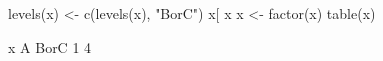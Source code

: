 \begin{Schunk}
\begin{Sinput}
  levels(x) <- c(levels(x), "BorC")
  x[ x %in% c("B", "C")] <- "BorC"
  x <- factor(x)
  table(x)
\end{Sinput}
\begin{Soutput}
x
   A BorC 
   1    4 
\end{Soutput}
\end{Schunk}
